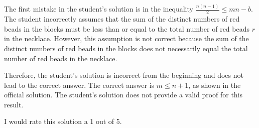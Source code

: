 The first mistake in the student's solution is in the inequality $\frac{n(n-1)}{2} \leq mn-b$. The student incorrectly assumes that the sum of the distinct numbers of red beads in the blocks must be less than or equal to the total number of red beads $r$ in the necklace. However, this assumption is not correct because the sum of the distinct numbers of red beads in the blocks does not necessarily equal the total number of red beads in the necklace.

Therefore, the student's solution is incorrect from the beginning and does not lead to the correct answer. The correct answer is $m \leq n+1$, as shown in the official solution. The student's solution does not provide a valid proof for this result. 

I would rate this solution a 1 out of 5.
